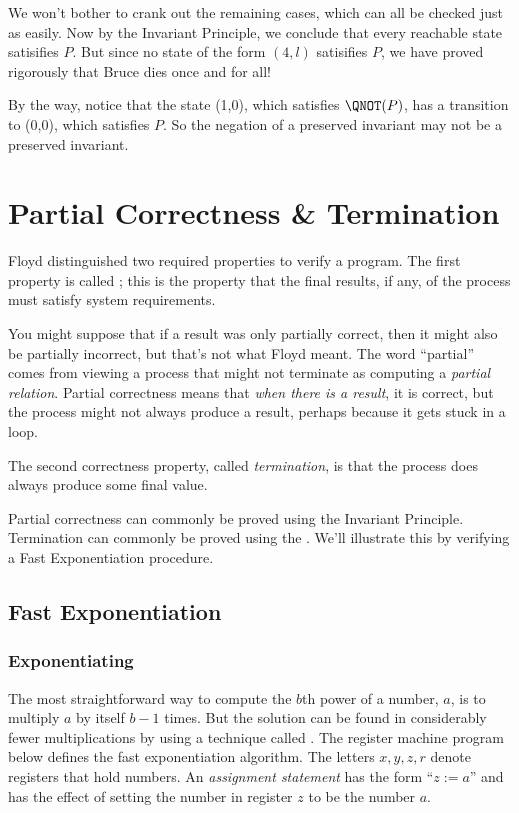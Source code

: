 We won't bother to crank out the remaining cases, which can all be checked
just as easily.  Now by the Invariant Principle, we conclude that every
reachable state satisifies $P$.  But since no state of the form $(4,l)$
satisifies $P$, we have proved rigorously that Bruce dies once and for
all!

By the way, notice that the state (1,0), which satisfies $\QNOT(P)$, has a
transition to (0,0), which satisfies $P$.  So the negation of a preserved
invariant may not be a preserved invariant.

\section{Partial Correctness \& Termination}\label{partial_correct_sec}

Floyd distinguished two required properties to verify a program.  The
first property is called ; this is the property
that the final results, if any, of the process must satisfy system
requirements.

You might suppose that if a result was only partially correct, then it
might also be partially incorrect, but that's not what Floyd meant.  The
word ``partial'' comes from viewing a process that might not terminate as
computing a \emph{partial relation}.  Partial correctness means that
\emph{when there is a result}, it is correct, but the process might not
always produce a result, perhaps because it gets stuck in a loop.

The second correctness property, called%
\emph{termination}, is that the
process does always produce some final value.

Partial correctness can commonly be proved using the Invariant Principle.
Termination can commonly be proved using the .
We'll illustrate this by verifying a Fast Exponentiation procedure.

\subsection{Fast Exponentiation}\label{fast_exp_subsec}

\subsubsection{Exponentiating}\label{fast_exp_subsubsec}
The most straightforward way to compute the $b$th power of a number,
$a$, is to multiply $a$ by itself $b-1$ times.  But the solution can
be found in considerably fewer multiplications by using a technique
called .  The register machine program below
defines the fast exponentiation algorithm.  The letters $x,y,z,r$
denote registers that hold numbers. An \emph{assignment statement} has
the form ``$z := a$'' and has the effect of setting the number in
register $z$ to be the number $a$.

